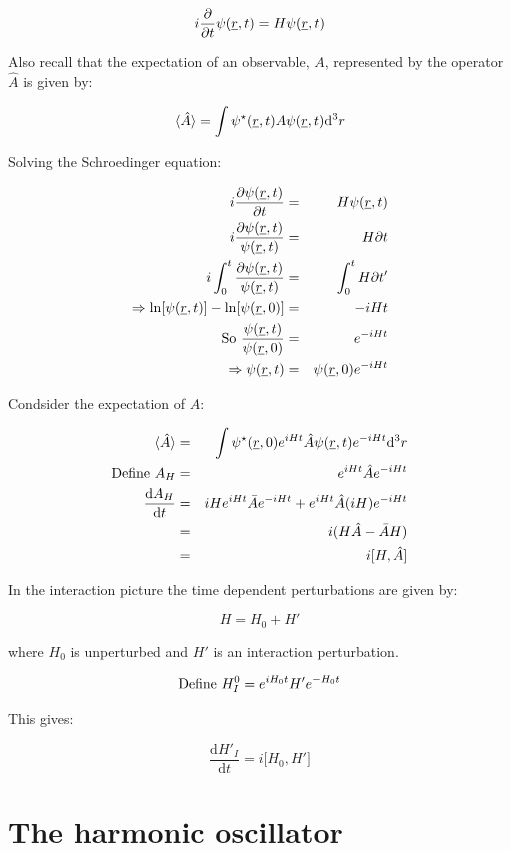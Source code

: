 \[
  i\frac{\partial}{\partial t}\psi(\underline{r},t) = H\psi(\underline{r},t)
\]

Also recall that the expectation of an observable, $A$, represented by the operator $\hat{A}$ is given by:

\[
  \langle \hat{A} \rangle = \int \psi^{\star}(\underline{r},t)A\psi(\underline{r},t)\mathrm{d}^3r
\]

Solving the Schroedinger equation:

\begin{eqnarray*}
  i\frac{\partial \psi(\underline{r},t)}{\partial t} & = & H\psi(\underline{r},t) \\
  i\frac{\partial \psi(\underline{r},t)}{\psi(\underline{r},t)} & = & H \partial t \\
  i\int_0^t \frac{\partial \psi(\underline{r},t)}{\psi(\underline{r},t)} & = & \int_0^t H \partial t' \\
  \Rightarrow \ln\lbrack\psi(\underline{r},t)\rbrack - \ln\lbrack\psi(\underline{r},0)\rbrack & = & -iHt \\
  \textrm{So } \frac{\psi(\underline{r},t)}{\psi(\underline{r},0)} & = & e^{-iHt} \\
  \Rightarrow \psi(\underline{r},t) & = & \psi(\underline{r},0)e^{-iHt}
\end{eqnarray*}

Condsider the expectation of $A$:

\begin{eqnarray*}
  \langle \hat{A} \rangle & = & \int\psi^{\star}(\underline{r},0)e^{iHt}\hat{A}\psi(\underline{r},t)e^{-iHt}\mathrm{d}^3r \\
  \textrm{Define }A_H & = & e^{iHt}\hat{A}e^{-iHt} \\
  \frac{\mathrm{d}A_H}{\mathrm{d}t} & = & iHe^{iHt}\bar{A}e^{-iHt} + e^{iHt}\hat{A}(iH)e^{-iHt} \\
  & = & i(H\hat{A} - \bar{A}H) \\
  & = & i\lbrack H , \hat{A} \rbrack
\end{eqnarray*}

In the interaction picture the time dependent perturbations are given by:

\[
  H = H_0 + H'
\]

where $H_0$ is unperturbed and $H'$ is an interaction perturbation.

\[
  \textrm{Define } H^0_I = e^{iH_0t}H'e^{-H_0t}
\]

This gives:

\[
  \frac{\mathrm{d}H'_I}{\mathrm{d}t} = i\lbrack H_0 , H' \rbrack
\]

\section{The harmonic oscillator}

